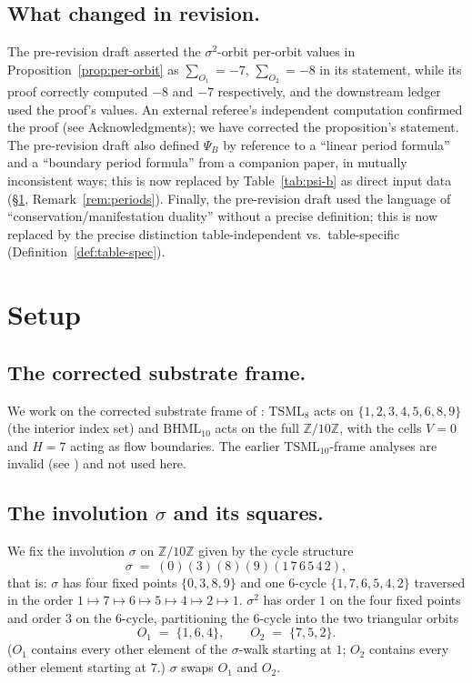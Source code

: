 \documentclass[11pt,reqno]{amsart}
\theoremstyle{plain}
\theoremstyle{definition}
\theoremstyle{remark}
\newcommand{\Z}{\mathbb{Z}}
\newcommand{\TS}{\mathrm{TSML}}
\newcommand{\BH}{\mathrm{BHML}}
\newcommand{\sig}{\sigma}
\begin{document}
\subsection{What changed in revision.}
The pre-revision draft asserted the $\sig^{2}$-orbit per-orbit values
in Proposition~\ref{prop:per-orbit} as $\sum_{O_1} = -7$, $\sum_{O_2} =
-8$ in its statement, while its proof correctly computed $-8$ and $-7$
respectively, and the downstream ledger used the proof's values.
An external referee's independent computation confirmed the proof
(see Acknowledgments); we have corrected the proposition's statement.
The pre-revision draft also defined $\Psi_B$ by reference to a
``linear period formula'' and a ``boundary period formula'' from a
companion paper, in mutually inconsistent ways; this is now replaced
by Table~\ref{tab:psi-b} as direct input data
(\S\ref{sec:setup}, Remark~\ref{rem:periods}).
Finally, the pre-revision draft used the language of
``conservation/manifestation duality'' without a precise definition;
this is now replaced by the precise distinction
table-independent vs.\ table-specific
(Definition~\ref{def:table-spec}).

\section{Setup}
\label{sec:setup}

\subsection{The corrected substrate frame.}
We work on the corrected substrate frame of
\cite{SandersGishFourCore, SandersBridgeWP9}: $\TS_{8}$ acts on
$\{1, 2, 3, 4, 5, 6, 8, 9\}$ (the interior index set) and $\BH_{10}$
acts on the full $\Z/10\Z$, with the cells $V = 0$ and $H = 7$ acting
as flow boundaries.  The earlier $\TS_{10}$-frame analyses are invalid
(see \cite[N10]{SandersBridgeWP9}) and not used here.

\subsection{The involution $\sig$ and its squares.}
We fix the involution $\sig$ on $\Z/10\Z$ given by the cycle structure
\[
\sig \;=\; (0)(3)(8)(9)(1\,7\,6\,5\,4\,2),
\]
that is: $\sig$ has four fixed points $\{0, 3, 8, 9\}$ and one
$6$-cycle $\{1, 7, 6, 5, 4, 2\}$ traversed in the order
$1 \mapsto 7 \mapsto 6 \mapsto 5 \mapsto 4 \mapsto 2 \mapsto 1$.
$\sig^{2}$ has order $1$ on the four fixed points and order $3$ on the
$6$-cycle, partitioning the $6$-cycle into the two triangular orbits
\[
O_{1} \;=\; \{1, 6, 4\},
\qquad O_{2} \;=\; \{7, 5, 2\}.
\]
($O_{1}$ contains every other element of the $\sig$-walk starting at
$1$; $O_{2}$ contains every other element starting at $7$.)
$\sig$ swaps $O_1$ and $O_2$.
\end{document}
